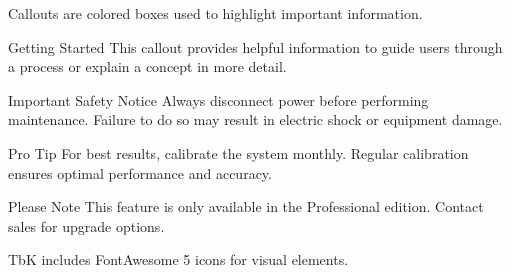 \documentclass[11pt,a4paper]{article}
\begin{document}

\clearpage
{}

Callouts are colored boxes used to highlight important information.


\begin{tbkInfo}{Getting Started}
This callout provides helpful information to guide users through a process or explain a concept in more detail.
\end{tbkInfo}


\begin{tbkWarning}{Important Safety Notice}
Always disconnect power before performing maintenance. Failure to do so may result in electric shock or equipment damage.
\end{tbkWarning}


\begin{tbkTip}{Pro Tip}
For best results, calibrate the system monthly. Regular calibration ensures optimal performance and accuracy.
\end{tbkTip}


\begin{tbkNote}{Please Note}
This feature is only available in the Professional edition. Contact sales for upgrade options.
\end{tbkNote}


\clearpage
{}

TbK includes FontAwesome 5 icons for visual elements.


\begin{tbkTable}[caption={Available Icons}]
\end{tbkTable}
\end{document}
